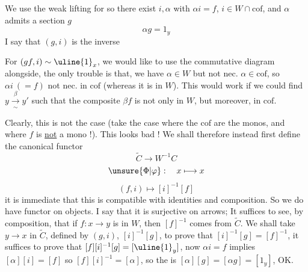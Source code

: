 We use the weak lifting  for
so there exist $i,\alpha$ with $\alpha i=f$,  $i\in W\cap\mathrm{cof}$, and $\alpha$ admits a section $g$
\[\alpha g=1_y\]
I say that $(g,i)$ is the inverse  

For $(gf,i)\sim\uline{1}_x$, we would like to use the commutative diagram alongside, the only trouble is that, we have $\alpha\in W$ but not nec. $\alpha\in\mathrm{cof}$, so $\alpha i\ (=f)$ not nec. in  $\mathrm{cof}$ (whereas it is in $W$).
This would work if we could find $y\xrightarrow[\sim]{\beta}y'$  such that the composite $\beta f$ is not only in $W$, but moreover, in $\mathrm{cof}$.

Clearly, this is not  the case (take the case where the $\mathrm{cof}$ are the monos, and where $f$ is \uline{not} a mono !). This looks bad !
We shall therefore instead first define the canonical functor
\[\widetilde C\longrightarrow W^{-1}C\]
\[\unsure{\Phi|\varphi}:\quad x\longmapsto x\]
\[(f,i)\longmapsto[i]^{-1}[f]\]
it is immediate that this is compatible with identities and composition. So we do have functor   on objects. I say that it is surjective on arrows; It suffices to see, by composition, that if $f:x\longrightarrow y$ is in $W$, then $[f]^{-1}$ comes from $\widetilde C$. We shall take  $y\longrightarrow x$ in $\widetilde C$, defined by $(g,i)$,  $[i]^{-1}[g]$, to prove that $[i]^{-1}[g]=[f]^{-1}$, it suffices to prove that $[f][i]^{-1}[g]=[\uline{1}_y]$, now $\alpha i=f$ implies $[\alpha][i]=[f]$ so $[f][i]^{-1}=[\alpha]$, so the  is $[\alpha][g]=[\alpha g]=[1_y]$, OK.
